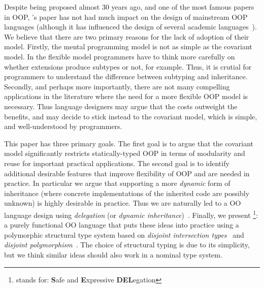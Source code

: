 \begin{comment}
\begin{itemize}

\item {\bf Inheritance and subtyping should be decoupled:} 
That is, there should be different mechanisms for class inheritance 
and class/interface subtyping. 

\item {\bf Extensions do not always produce subtypes:} 
There are cases where classes can inherit from other classes without 
producing subtypes. 

\end{itemize}

\end{comment}

Despite being proposed almost 30 years ago, and one of the most famous papers in
OOP, \citeauthor{cook1989inheritance}'s paper has not had much impact on the design of mainstream OOP
languages (although it has influenced the design of several academic
languages~\cite{america1991designing,graver1989type,chambers1992object,bruce1995polytoil}).
We believe that there are two primary reasons for the lack of adoption
of their model.  Firstly, the mental programming model is not
as simple as the covariant model. In the flexible model programmers have to
think more carefully on whether extensions produce subtypes or not,
for example.  Thus, it is crutial for programmers to understand the
difference between subtyping and inheritance.
Secondly, and perhaps more importantly, there are not many compelling applications in
the literature where the need for a more flexible OOP model is
necessary. Thus language designers may argue that the costs outweight 
the benefits, and may decide to stick instead to the covariant 
model, which is simple, and well-understood by programmers. 

This paper has three primary goals. The first goal is to argue that the
covariant model significantly restricts statically-typed OOP in terms of
modularity and reuse for important practical applications. The second goal is to
identify additional desirable features that improve flexibility of OOP and are
needed in practice. In particular we argue that supporting a more \emph{dynamic}
form of inheritance (where concrete implementations of the inherited code are
possibly unknown) is highly desirable in practice. Thus we are naturally led to
a OO language design using \emph{delegation} (or \emph{dynamic
  inheritance})~\cite{ungar1988self,chambers1992object}. Finally, we present
\name\footnote{\name stands for: {\bf S}afe and {\bf E}xpressive {\bf
    DEL}egation}: a purely functional OO language that puts these ideas into
practice using a polymorphic structural type system based on \emph{disjoint
  intersection types}~\cite{oliveira2016disjoint} and \emph{disjoint
  polymorphism}~\cite{alpuimdisjoint}. The choice of structural typing is due to
its simplicity, but we think similar ideas should also work in a nominal type
system.

